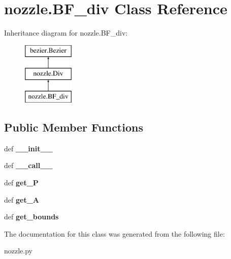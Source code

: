 \hypertarget{classnozzle_1_1BF__div}{\section{nozzle.\-B\-F\-\_\-div \-Class \-Reference}
\label{classnozzle_1_1BF__div}
}
\-Inheritance diagram for nozzle.\-B\-F\-\_\-div\-:\begin{figure}[H]
\begin{center}
\leavevmode
\includegraphics[height=3.000000cm]{classnozzle_1_1BF__div}
\end{center}
\end{figure}
\subsection*{\-Public \-Member \-Functions}
\begin{DoxyCompactItemize}
\item 
\hypertarget{classnozzle_1_1BF__div_a6587a3e9966faad931d46ab694eda13c}{def {\bfseries \-\_\-\-\_\-init\-\_\-\-\_\-}}\label{classnozzle_1_1BF__div_a6587a3e9966faad931d46ab694eda13c}

\item 
\hypertarget{classnozzle_1_1BF__div_af4c3cbda8c52d3ea68dc5097296e9799}{def {\bfseries \-\_\-\-\_\-call\-\_\-\-\_\-}}\label{classnozzle_1_1BF__div_af4c3cbda8c52d3ea68dc5097296e9799}

\item 
\hypertarget{classnozzle_1_1BF__div_ac5941d7080c648346029a7de5f392fd9}{def {\bfseries get\-\_\-\-P}}\label{classnozzle_1_1BF__div_ac5941d7080c648346029a7de5f392fd9}

\item 
\hypertarget{classnozzle_1_1BF__div_a78b7f95ae7ccdc18b5024f24925ef7dc}{def {\bfseries get\-\_\-\-A}}\label{classnozzle_1_1BF__div_a78b7f95ae7ccdc18b5024f24925ef7dc}

\item 
\hypertarget{classnozzle_1_1BF__div_a3907b91e2e0035b7449ec46d82d3fec5}{def {\bfseries get\-\_\-bounds}}\label{classnozzle_1_1BF__div_a3907b91e2e0035b7449ec46d82d3fec5}

\end{DoxyCompactItemize}


\-The documentation for this class was generated from the following file\-:\begin{DoxyCompactItemize}
\item 
nozzle.\-py\end{DoxyCompactItemize}

